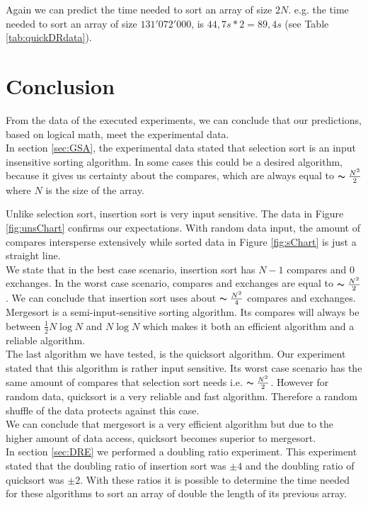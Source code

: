 \documentclass[pdftex,11pt,a4paper,english,titlepage]{article}
\begin{document}
Again we can predict the time needed to sort an array of size $2N$. e.g. the time needed to sort an array of size $131'072'000$, is $44{,}7s*2 = 89{,}4s$ (see Table \ref{tab:quickDRdata}).
\newpage
\section{Conclusion}
From the data of the executed experiments, we can conclude that our predictions, based on logical math, meet the experimental data.\\

In section \ref{sec:GSA}, the experimental data stated that selection sort is an input insensitive sorting algorithm. In some cases this could be a desired algorithm, because it gives us certainty about the compares, which are always equal to $\thicksim\frac{N^2}{2}$ where $N$ is the size of the array.

Unlike selection sort, insertion sort is very input sensitive. The data in Figure \ref{fig:unsChart} confirms our expectations. With random data input, the amount of compares intersperse extensively while sorted data in Figure \ref{fig:sChart} is just a straight line.\\
We state that in the best case scenario, insertion sort has $N-1$ compares and $0$ exchanges. In the worst case scenario, compares and exchanges are equal to $\thicksim\frac{N^2}{2}$. We can conclude that insertion sort uses about $\thicksim\frac{N^2}{4}$ compares and exchanges.\\

Mergesort is a semi-input-sensitive sorting algorithm. Its compares will always be between $\frac{1}{2}N\log N$ and $N\log N$ which makes it both an efficient algorithm and a reliable algorithm.\\

The last algorithm we have tested, is the quicksort algorithm. Our experiment stated that this algorithm is rather input sensitive. Its worst case scenario has the same amount of compares that selection sort needs i.e. $\thicksim\frac{N^2}{2}$. However for random data, quicksort is a very reliable and fast algorithm. Therefore a random shuffle of the data protects against this case.\\

We can conclude that mergesort is a very efficient algorithm but due to the higher amount of data access, quicksort becomes superior to mergesort.\\


In section \ref{sec:DRE} we performed a doubling ratio experiment. This experiment stated that the doubling ratio of insertion sort was $\pm 4$ and the doubling ratio of quicksort was $\pm 2$. With these ratios it is possible to determine the time needed for these algorithms to sort an array of double the length of its previous array.


\newpage


\end{document}
